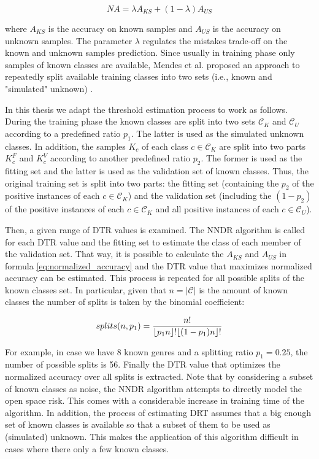 \begin{equation}
\label{eq:normalized_accuracy}
NA = \lambda A_{KS} + (1 - \lambda) A_{US}
\end{equation}

\nointend where $A_{KS}$ is the accuracy on known samples and $A_{US}$ is the accuracy on unknown samples. The parameter $\lambda$ regulates the mistakes trade-off on the known and unknown samples prediction. Since usually in training phase only samples of known classes are available, Mendes et al. proposed an approach to repeatedly split available training classes into two sets (i.e., known and "simulated" unknown) . 

In this thesis we adapt the threshold estimation process to work as follows. During the training phase the known classes are split into two sets $\mathcal{C}_K$ and $\mathcal{C}_{U}$ according to a predefined ratio $p_1$. The latter is used as the simulated unknown classes. In addition, the samples $K_c$ of each class $c \in \mathcal{C}_K$ are split into two parts $K_c^F$ and $K_c^V$ according to another predefined ratio $p_2$. The former is used as the fitting set and the latter is used as the validation set of known classes. Thus, the original training set is split into two parts: the fitting set (containing the $p_2$ of the positive instances of each $c \in \mathcal{C}_K$) and the validation set (including the $(1-p_2)$ of the positive instances of each $c \in \mathcal{C}_K$ and all positive instances of each $c \in \mathcal{C}_U$). 

Then, a given range of DTR values is examined. The NNDR algorithm is called for each DTR value and the fitting set to estimate the class of each member of the validation set. That way, it is possible to calculate the $A_{KS}$ and $A_{US}$ in formula \ref{eq:normalized_accuracy} and the DTR value that maximizes normalized accuracy can be estimated. This process is repeated for all possible splits of the known classes set. In particular, given that $n = |\mathcal{C}|$ is the amount of known classes the number of splits is taken by the binomial coefficient:

\begin{equation} \label{eq:splt}
    splits(n,p_1) = \frac{n!}{\floor*{p_1n}!\floor*{(1-p_1)n}!}
\end{equation}

For example, in case we have 8 known genres and a splitting ratio $p_1=0.25$, the number of possible splits is 56. Finally the DTR value that optimizes the normalized accuracy over all splits is extracted. Note that by considering a subset of known classes as noise, the NNDR algorithm attempts to directly model the open space risk. This comes with a considerable increase in training time of the algorithm. In addition, the process of estimating DRT assumes that a big enough set of known classes is available so that a subset of them to be used as (simulated) unknown. This makes the application of this algorithm difficult in cases where there only a few known classes.

